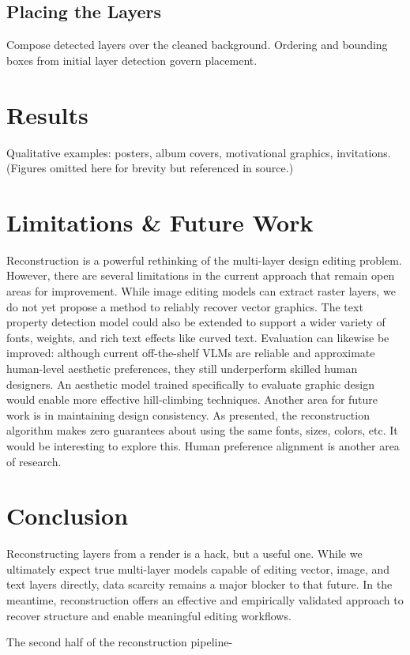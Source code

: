 \documentclass{article}
\begin{document}
\subsection{Placing the Layers}
Compose detected layers over the cleaned background. Ordering and bounding boxes from initial layer detection govern placement.


\section{Results}
Qualitative examples: posters, album covers, motivational graphics, invitations. (Figures omitted here for brevity but referenced in source.)

\section{Limitations \& Future Work}
Reconstruction is a powerful rethinking of the multi-layer design editing problem. However, there are several limitations in the current approach that remain open areas for improvement. While image editing models can extract raster layers, we do not yet propose a method to reliably recover vector graphics. The text property detection model could also be extended to support a wider variety of fonts, weights, and rich text effects like curved text. Evaluation can likewise be improved: although current off-the-shelf VLMs are reliable and approximate human-level aesthetic preferences, they still underperform skilled human designers. An aesthetic model trained specifically to evaluate graphic design would enable more effective hill-climbing techniques. Another area for future work is in maintaining design consistency. As presented, the reconstruction algorithm makes zero guarantees about using the same fonts, sizes, colors, etc. It would be interesting to explore this. Human preference alignment is another area of research.


\section{Conclusion}
Reconstructing layers from a render is a hack, but a useful one. While we ultimately expect true multi-layer models capable of editing vector, image, and text layers directly, data scarcity remains a major blocker to that future. In the meantime, reconstruction offers an effective and empirically validated approach to recover structure and enable meaningful editing workflows.

The second half of the reconstruction pipeline- 
\end{document}
